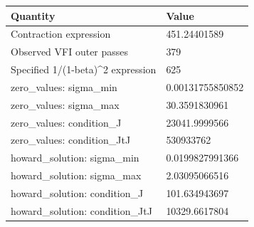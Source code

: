 \begin{tabular}{ll}
\hline
Quantity & Value \\
\hline
Contraction expression & 451.24401589 \\
Observed VFI outer passes & 379 \\
Specified 1/(1-beta)^2 expression & 625 \\
zero\_values: sigma\_min & 0.00131755850852 \\
zero\_values: sigma\_max & 30.3591830961 \\
zero\_values: condition\_J & 23041.9999566 \\
zero\_values: condition\_JtJ & 530933762 \\
howard\_solution: sigma\_min & 0.0199827991366 \\
howard\_solution: sigma\_max & 2.03095066516 \\
howard\_solution: condition\_J & 101.634943697 \\
howard\_solution: condition\_JtJ & 10329.6617804 \\
\hline
\end{tabular}
